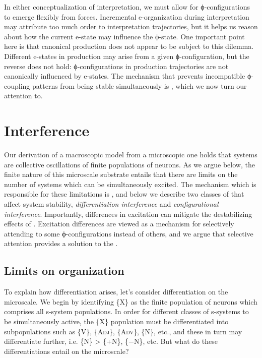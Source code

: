   In either conceptualization of interpretation, we must allow for ϕ-con\-fig\-u\-ra\-tions to emerge flexibly from  forces. Incremental e-organization during interpretation may attribute too much order to interpretation trajectories, but it helps us reason about how the current e-state may influence the ϕ-state. One important point here is that canonical production does not appear to be subject to this dilemma. Different e-states in production may arise from a given ϕ-con\-fig\-u\-ra\-tion, but the reverse does not hold: ϕ-con\-fig\-u\-ra\-tions in production trajectories are not canonically influenced by e-states. The mechanism that prevents incompatible ϕ-coupling patterns from being stable simultaneously is , which we now turn our attention to.

\section{Interference}

Our derivation of a macroscopic model from a microscopic one holds that systems are collective oscillations of finite populations of neurons. As we argue below, the finite nature of this microscale substrate entails that there are limits on the number of  systems which can be simultaneously excited. The mechanism which is responsible for these limitations is , and below we describe two classes of  that affect system stability, \textit{differentiation interference} and \textit{configurational interference}. Importantly, differences in excitation can mitigate the destabilizing effects of . Excitation differences are viewed as a mechanism for selectively attending to some ϕ-con\-fig\-u\-ra\-tions instead of others, and we argue that selective attention provides a solution to the .

\subsection{Limits on organization}

To explain how differentiation  arises, let's consider differentiation on the microscale. We begin by identifying \{X\} as the finite population of neurons which comprises all s-system populations. In order for different classes of s-systems to be simultaneously active, the \{X\} population must be differentiated into subpopulations such as \{V\}, \{A\textsc{dj}\}, \{A\textsc{dv}\}, \{N\}, etc., and these in turn may differentiate further, i.e. \{N\} > \{+N\}, \{−N\}, etc. But what do these differentiations entail on the microscale?

